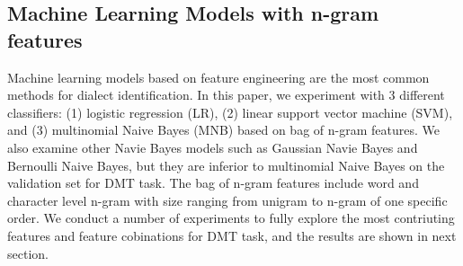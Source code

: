\documentclass[11pt,a4paper]{article}
\begin{document}
\subsection{Machine Learning Models with n-gram features\label{ml models}}
Machine learning models based on feature engineering are the most common methods for dialect identification. In this paper, we experiment with 3 different classifiers: (1) logistic regression (LR), (2) linear support vector machine (SVM), and (3) multinomial Naive Bayes (MNB) based on bag of n-gram features. We also examine other Navie Bayes models such as Gaussian Navie Bayes and Bernoulli Naive Bayes, but they are inferior to multinomial Naive Bayes on the validation set for DMT task. The bag of n-gram features include word and character level n-gram with size ranging from unigram to n-gram of one  specific order. We conduct a number of experiments to fully explore the most contriuting features and feature cobinations for DMT task, and the results are shown in next section.
\end{document}
